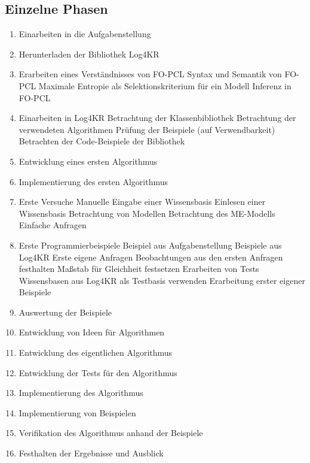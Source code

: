 \documentclass[a4paper, 11pt]{book}
\begin{document}
\subsection{Einzelne Phasen}

\begin{enumerate}
	\item Einarbeiten in die Aufgabenstellung
	\item Herunterladen der Bibliothek Log4KR
	\item Erarbeiten eines Verständnisses von FO-PCL
	\subitem Syntax und Semantik von FO-PCL
	\subitem Maximale Entropie als Selektionskriterium für ein Modell
	\subitem Inferenz in FO-PCL
	\item Einarbeiten in Log4KR
	\subitem Betrachtung der Klassenbibliothek 
	\subitem Betrachtung der verwendeten Algorithmen
	\subitem Prüfung der Beispiele (auf Verwendbarkeit)
	\subitem Betrachten der Code-Beispiele der Bibliothek
	\item Entwicklung eines ersten Algorithmus
	\item Implementierung des ersten Algorithmus
	\item Erste Versuche 
	\subitem Manuelle Eingabe einer Wissensbasis
	\subitem Einlesen einer Wissensbasis
	\subitem Betrachtung von Modellen
	\subitem Betrachtung des ME-Modells
	\subitem Einfache Anfragen
	\item Erste Programmierbeispiele
	\subitem Beispiel aus Aufgabenstellung
	\subitem Beispiele aus Log4KR
	\subitem Erste eigene Anfragen
	\subitem Beobachtungen aus den ersten Anfragen festhalten
	\subitem Maßstab für Gleichheit festsetzen 
	\subitem Erarbeiten von Tests
	\subitem Wissensbasen aus Log4KR als Testbasis verwenden
	\subitem Erarbeitung erster eigener Beispiele
	\item Auswertung der Beispiele
	\item Entwicklung von Ideen für Algorithmen
	\item Entwicklung des eigentlichen Algorithmus
	\item Entwicklung der Tests für den Algorithmus 
	\item Implementierung des Algorithmus
	\item Implementierung von Beispielen 
	\item Verifikation des Algorithmus anhand der Beispiele
	\item Festhalten der Ergebnisse und Ausblick
	
\end{enumerate}
\end{document}

